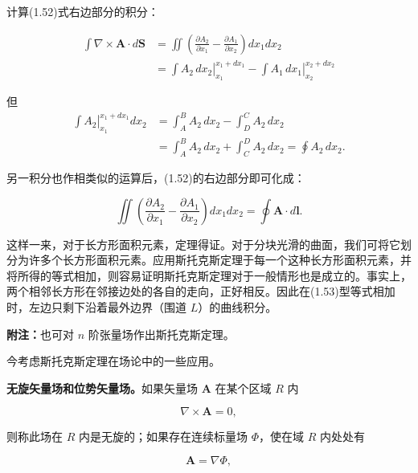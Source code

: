 \documentclass[11pt,a4paper,oneside]{ctexbook}
\newcommand{\ve}[1]{\bm{#1}}
\begin{document}
计算(1.52)式右边部分的积分：

\begin{equation*}
\begin{aligned}
\int \nabla \times \ve{A} \cdot d\ve{S}
&= \iint \left(\frac{\partial A_2}{\partial x_1} - \frac{\partial A_1}{\partial x_2}\right) dx_1 dx_2\\
&= \left.\int A_2\, dx_2\right|_{x_1}^{x_1 + dx_1} - \left.\int A_1\, dx_1\right|_{x_2}^{x_2 + dx_2}
\end{aligned}
\end{equation*}

但
\begin{equation*}
\begin{aligned}
\left.\int A_2\right|_{x_1}^{x_1 + dx_1} dx_2 &= \int_{A}^{B} A_2\, dx_2 - \int_{D}^{C} A_2\, dx_2\\
&= \int_{A}^{B} A_2\, dx_2 + \int_{C}^{D} A_2\, dx_2 = \oint A_2\, dx_2.
\end{aligned}
\end{equation*}

另一积分也作相类似的运算后，(1.52)的右边部分即可化成：

\begin{equation}
\iint \left(\frac{\partial A_2}{\partial x_1} - \frac{\partial A_1}{\partial x_2}\right) dx_1 dx_2 = \oint \ve{A} \cdot d\ve{l}.
\tag{1.53}
\end{equation}

这样一来，对于长方形面积元素，定理得证。对于分块光滑的曲面，我们可将它划分为许多个长方形面积元素。应用斯托克斯定理于每一个这种长方形面积元素，并将所得的等式相加，则容易证明斯托克斯定理对于一般情形也是成立的。事实上，两个相邻长方形在邻接边处的各自的走向，正好相反。因此在(1.53)型等式相加时，左边只剩下沿着最外边界（围道 $L$）的曲线积分。

\textbf{附注：}也可对 $n$ 阶张量场作出斯托克斯定理。

今考虑斯托克斯定理在场论中的一些应用。

\textbf{无旋矢量场和位势矢量场。}如果矢量场 $\ve{A}$ 在某个区域 $R$ 内

\begin{equation*}
\nabla \times \ve{A} = 0,
\end{equation*}

则称此场在 $R$ 内是无旋的；如果存在连续标量场 $\Phi$，使在域 $R$ 内处处有

\begin{equation*}
\ve{A} = \nabla\Phi,
\end{equation*}
\end{document}

